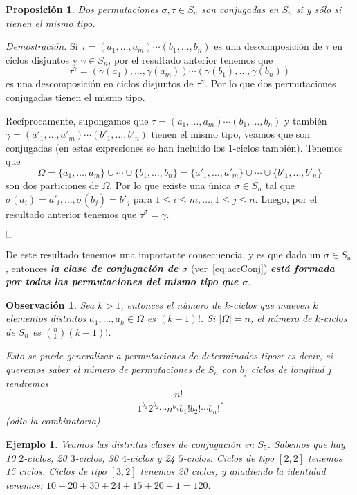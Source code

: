\documentclass[12pt]{article}
\newtheorem{proposition}[theorem]{Proposición}
\newtheorem{example}{Ejemplo}[theorem]
\newtheorem{observation}{Observación}[theorem]
\begin{document}
\begin{proposition}Dos permutaciones $\sigma, \tau \in S_{n}$ son conjugadas en $S_{n}$ si y sólo si tienen el mismo tipo.
\end{proposition}
\emph{Demostración: }
Si $\tau =(a_{1}, \ldots, a_{m})\cdots(b_{1}, \ldots, b_{n})$ es una descomposición de $\tau$ en ciclos disjuntos y $\gamma \in S_{n}$, por el resultado anterior tenemos que $$\tau^{\gamma}=(\gamma(a_{1}), \ldots, \gamma(a_{m})) \cdots (\gamma(b_{1}), \ldots, \gamma(b_{n}))$$ es una descomposición en ciclos disjuntos de $\tau^{\gamma}$. Por lo que dos permutaciones conjugadas tienen el mismo tipo.

Recíprocamente, supongamos que $\tau =(a_{1}, \ldots, a_{m}) \cdots(b_{1}, \ldots, b_{n})$ y también $\gamma = (a'_{1}, \ldots, a'_{m})\cdots(b'_{1}, \ldots, b'_{n})$ tienen el mismo tipo, veamos que son conjugadas (en estas expresiones se han incluido los $1$-ciclos también). Tenemos que $$\Omega = \lbrace a_{1}, \ldots, a_{m} \rbrace \cup \cdots \cup \lbrace b_{1}, \ldots, b_{n} \rbrace = \lbrace a'_{1}, \ldots, a'_{m} \rbrace \cup \cdots \cup \lbrace b'_{1}, \ldots, b'_{n} \rbrace$$
son dos particiones de $\Omega$. Por lo que existe una única $\sigma \in S_{n}$ tal que $\sigma(a_{i})=a'_{i}, \ldots, \sigma(b_{j})=b'_{j}$ para $1\leq i \leq m, \ldots, 1 \leq j \leq n$. Luego, por el resultado anterior tenemos que $\tau^{\sigma} = \gamma.$

$\hfill \square$

De este resultado tenemos una importante consecuencia, y es que dado un $\sigma \in S_{n}$, entonces \textbf{\textit{la clase de conjugación de $\sigma$}} (ver~\ref{eq:accConj}) \textbf{\textit{está formada por todas las permutaciones del mismo tipo que $\sigma$}}.

\begin{observation} Sea $k>1$, entonces el número de $k$-ciclos que mueven $k$ elementos distintos $a_{1}, \ldots, a_{k} \in \Omega$ es $(k-1)!$. Si $|\Omega| = n$, el número de $k$-ciclos de $S_{n}$ es ${n \choose k} (k-1)!$.

Esto se puede generalizar a permutaciones de determinados tipos: es decir, si queremos saber el número de permutaciones de $S_{n}$ con $b_{j}$ ciclos de longitud $j$ tendremos $$ \dfrac{n!}{1^{b_{1}}2^{b_{2}} \cdots n^{b_{n}}b_{1}!b_{2}!\cdots b_{n}!}.$$(odio la combinatoria)
\end{observation}

\begin{example}
Veamos las distintas clases de conjugación en $S_{5}$. Sabemos que hay 10 $2$-ciclos, 20 $3$-ciclos, 30 $4$-ciclos y 24 $5$-ciclos. Ciclos de tipo $[2,2]$ tenemos 15 ciclos. Ciclos de tipo $[3,2]$ tenemos 20 ciclos, y añadiendo la identidad tenemos: $10+20+30+24+15+20+1 = 120.$
\end{example}
\end{document}
